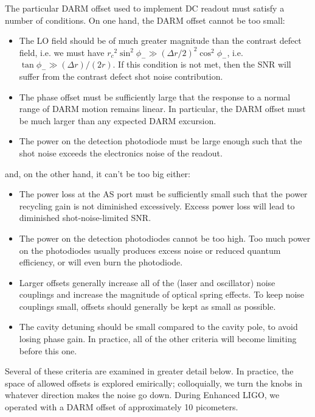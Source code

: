 The particular DARM offset used to implement DC readout must satisfy a
number of conditions.  On one hand, the DARM offset cannot be too small:
\begin{itemize}
\item The LO field should be of much greater magnitude than the contrast
  defect field, i.e. we must have ${r_c}^2\sin^2\phi_- \gg (\Delta
  r/2)^2 \cos^2\phi_-$, i.e. $\tan \phi_- \gg (\Delta r)/(2r)$.  If this condition is not met, then the SNR
  will suffer from the contrast defect shot noise contribution.
\item The phase offset must be sufficiently large that the response to
  a normal range of DARM motion remains linear.  In particular, the
  DARM offset must be much larger than any expected DARM excursion.
\item The power on the detection photodiode must be large enough such
  that the shot noise exceeds the electronics noise of the readout.
\end{itemize}
and, on the other hand, it can't be too big either:
\begin{itemize}
\item The power loss at the AS port must be sufficiently small such
  that the power recycling gain is not diminished excessively.  Excess
  power loss will lead to diminished shot-noise-limited SNR.
\item The power on the detection photodiodes cannot be too high.  Too
  much power on the photodiodes usually produces excess noise or
  reduced quantum efficiency, or will even burn the photodiode.
\item Larger offsets generally increase all of the (laser and
  oscillator) noise couplings and increase the magnitude of optical
  spring effects.  To keep noise couplings small, offsets should
  generally be kept as small as possible.
\item The cavity detuning should be small compared to the cavity pole,
  to avoid losing phase gain.  In practice, all of the other criteria
  will become limiting before this one.
\end{itemize}
Several of these criteria are examined in greater detail below.  In
practice, the space of allowed offsets is explored emirically;
colloquially, we turn the knobs in whatever direction makes the noise
go down.  During Enhanced LIGO, we operated with a DARM offset of
approximately 10 picometers.

